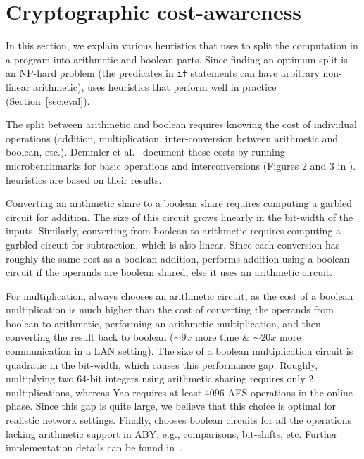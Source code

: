 \section{Cryptographic cost-awareness}
 \label{sec:ccc}
In this section, we explain various heuristics that \tool uses to split
the computation in a program into arithmetic and
boolean parts. Since finding an optimum split  is an NP-hard problem (the predicates in {\tt if} statements can have arbitrary non-linear arithmetic),
\tool uses heuristics  that  perform well in practice (Section~\ref{sec:eval}).

The split
between arithmetic and boolean requires knowing the cost of
individual operations
(addition, multiplication, inter-conversion between arithmetic and boolean, etc.).
Demmler
et al.~\cite{aby} document these costs by running
microbenchmarks for basic operations and interconversions (Figures
2 and 3 in \cite{aby}). \tool heuristics are based on their results.

 Converting
an arithmetic share to a boolean share requires computing a garbled
circuit for addition. The size of this circuit grows  linearly in the bit-width of the inputs. Similarly, converting from boolean to arithmetic requires computing a 
garbled circuit for subtraction, which is also linear. 
Since each conversion has roughly the same cost as a boolean addition,
 \tool performs
addition using a boolean circuit
if the operands  are boolean shared, else it uses an arithmetic
circuit. 

For multiplication, \tool always chooses
an arithmetic circuit, as the cost of a boolean multiplication is much
higher than the cost of converting the operands from boolean to
arithmetic, performing an arithmetic multiplication, and then converting
the result back to boolean ($\sim9x$ more time $\&$ $\sim20x$ more
communication in a LAN setting). The size of a boolean multiplication circuit is quadratic in the bit-width, which causes this performance gap.
Roughly, multiplying two $64$-bit integers using arithmetic sharing requires only $2$ multiplications, whereas Yao requires at least $4096$ AES operations in the online phase.
Since this gap is quite large, we believe that this choice is optimal for realistic network
settings. Finally, \tool chooses boolean circuits for all
the operations lacking arithmetic support in ABY, e.g., comparisons, bit-shifts, etc.
Further implementation details can be found in~.


